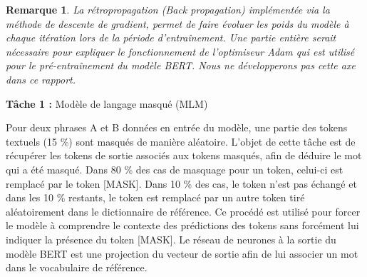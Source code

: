 \documentclass[12pt]{article}
\newtheorem{rmq}{Remarque}
\theoremstyle{definition}
\begin{document}
\begin{rmq}
	
	La rétropropagation (Back propagation) implémentée via la méthode de descente de gradient, permet de faire évoluer les poids du modèle à chaque itération lors de la période d'entraînement. Une partie entière serait nécessaire pour expliquer le fonctionnement de l'optimiseur Adam qui est utilisé pour le pré-entraînement du modèle BERT. Nous ne développerons pas cette axe dans ce rapport.
	
\end{rmq}


\textbf{Tâche 1 :} Modèle de langage masqué (MLM)

Pour deux phrases A et B données en entrée du modèle, une partie des tokens textuels (15 \%) sont masqués de manière aléatoire. L’objet de cette tâche est de récupérer les tokens de sortie associés aux tokens masqués, afin de déduire le mot qui a été masqué. Dans 80 \% des cas de masquage pour un token, celui-ci est remplacé par le token [MASK]. Dans 10 \% des cas, le token n’est pas échangé et dans les 10 \% restants, le token est remplacé par un autre token tiré aléatoirement dans le dictionnaire de référence. Ce procédé est utilisé pour forcer le modèle à comprendre le contexte des prédictions des tokens sans forcément lui indiquer la présence du token [MASK]. Le réseau de neurones à la sortie du modèle BERT est une projection du vecteur de sortie afin de lui associer un mot dans le vocabulaire de référence.
\end{document}
